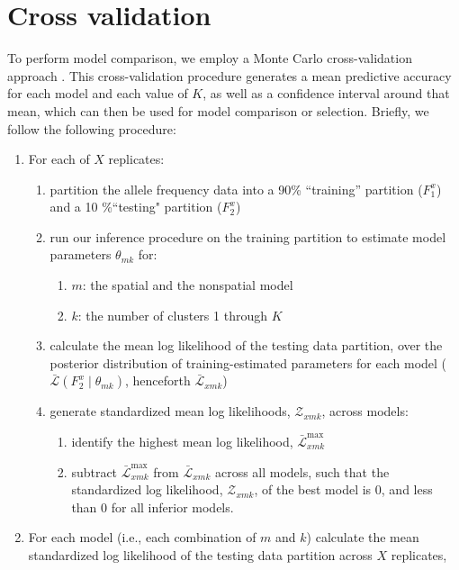 \documentclass[12pt]{article}
\begin{document}
\section{Cross validation}\label{Xvalidation}
To perform model comparison, we employ a Monte Carlo cross-validation approach \citep{picard1984}.
This cross-validation procedure generates a mean predictive accuracy for each model and each value of $K$, 
as well as a confidence interval around that mean,
which can then be used for model comparison or selection.
Briefly, we follow the following procedure:
\begin{enumerate}
\item For each of $X$ replicates:
	\begin{enumerate}
		\item partition the allele frequency data into a 90\% ``training'' partition ($F^x_1$) and a 10 \%``testing" partition ($F^x_2$) \label{partition}
		\item run our inference procedure on the training partition to estimate model parameters $\theta_{mk}$ for: \label{inference}
			\begin{enumerate}
				\item $m$: the spatial and the nonspatial model
				\item $k$: the number of clusters 1 through $K$
			\end{enumerate}	
	\item calculate the mean log likelihood of the testing data partition, 
	over the posterior distribution of training-estimated parameters for each model 
	($\bar{\mathcal{L}}(F^x_2 \mid \theta_{mk})$, henceforth $\bar{\mathcal{L}}_{xmk}$) \label{lnL}
	\item generate standardized mean log likelihoods, $\mathcal{Z}_{xmk}$, across models: \label{standardize}
		\begin{enumerate}
			\item identify the highest mean log likelihood, $\bar{\mathcal{L}}^\text{max}_{xmk}$
			\item subtract $\bar{\mathcal{L}}^\text{max}_{xmk}$ from $\bar{\mathcal{L}}_{xmk}$ across all models,
				such that the standardized log likelihood, $\mathcal{Z}_{xmk}$, of the best model is 0,
				and less than 0 for all inferior models. 
		\end{enumerate}
	\end{enumerate}
\item For each model (i.e., each combination of $m$ and $k$) calculate 
	the mean standardized log likelihood of the testing data partition across $X$ replicates, 

\end{enumerate}
\end{document}

